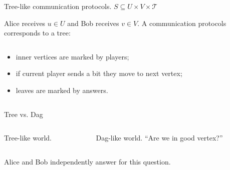 \begin{frame}{Tree-like communication protocols. $S \subseteq U \times V \times \mathcal{T}$}

    Alice receives $u \in U$ and Bob receives $v \in V$. A communication protocols corresponds to a tree:

    \begin{columns}[t]
		\begin{column}{0.6\textwidth}
            \begin{itemize}
                \item<2-> inner vertices are marked by players;
	            \item<3-> if current player sends a bit they move to next vertex;
    		    \item<8-> leaves are marked by answers.
	        \end{itemize}

            \vspace{0.5cm}
        \end{column}
        
		\begin{column}{0.3\textwidth}
            
		\end{column}
	\end{columns}

\end{frame}


\begin{frame}{Tree vs. Dag}

	\begin{columns}[t]
		\begin{column}{0.52\textwidth}
            \begin{center}
                Tree-like world.
                \vspace{0.2cm}
                
            \end{center}
        \end{column}

        \pause
		\begin{column}{0.48\textwidth}
            \begin{center}
                Dag-like world. ``Are we in good vertex?''
                \vspace{0.2cm}
                
            \end{center}
		\end{column}
	\end{columns}

    \pause
    \pause
    \vspace{0.4cm}
    Alice and Bob independently answer for this question.
\end{frame}

